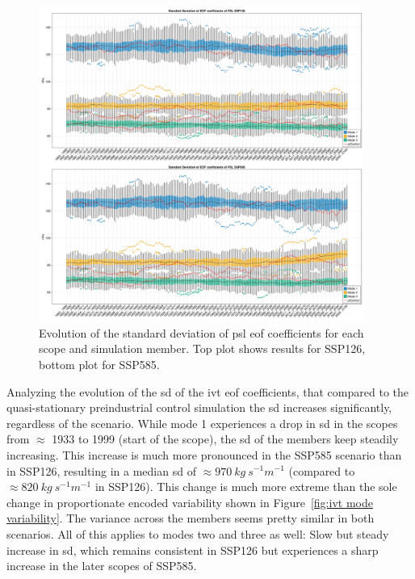 \begin{figure}[ht]
  \begin{center}
    \includegraphics[width=0.95\textwidth]{figures/std_psl_50seasons_tempmodescale_3modes.png}
  \end{center}
  \caption[PSL SD Evolution]{Evolution of the standard deviation of \ac{psl} \ac{eof} coefficients for each scope and simulation member. Top plot shows results for SSP126, bottom plot for SSP585.}
  \label{fig:std psl evolution}
\end{figure}

Analyzing the evolution of the \ac{sd} of the \ac{ivt} \ac{eof} coefficients, that compared to the quasi-stationary preindustrial control simulation the \ac{sd} increases significantly, regardless of the scenario. 
While mode 1 experiences a drop in \ac{sd} in the scopes from $\approx$ 1933 to 1999 (start of the scope), the \ac{sd} of the members keep steadily increasing. 
This increase is much more pronounced in the SSP585 scenario than in SSP126, resulting in a median \ac{sd} of $\approx 970~kg~s^{-1} m^{-1}$ (compared to $\approx 820~kg~s^{-1}m^{-1}$ in SSP126). 
This change is much more extreme than the sole change in proportionate encoded variability shown in Figure~\ref{fig:ivt mode variability}. 
The variance across the members seems pretty similar in both scenarios. 
All of this applies to modes two and three as well: Slow but steady increase in \ac{sd}, which remains consistent in SSP126 but experiences a sharp increase in the later scopes of SSP585.  




